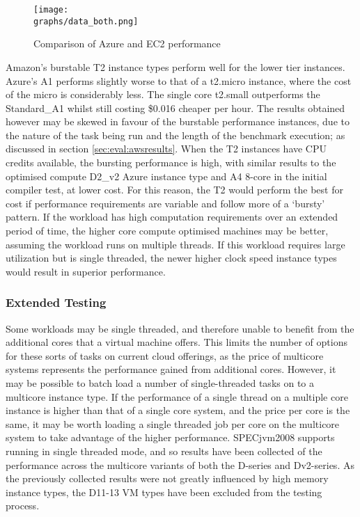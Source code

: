 \documentclass{entcs} \usepackage{entcsmacro}
\newcommand{\graphs}{../analysis/graphs}
\begin{document}
\begin{figure}[ht]
  \centering
  \texttt{[image: \\graphs/data\_both.png]}
  \caption{Comparison of Azure and EC2 performance}
  \label{fig:bothchart}
\end{figure}

Amazon's burstable T2 instance types perform well for the lower tier instances. Azure's A1 performs slightly worse to that of a t2.micro instance, where the cost of the micro is considerably less. The single core t2.small outperforms the Standard\_A1 whilst still costing \$0.016 cheaper per hour. The results obtained however may be skewed in favour of the burstable performance instances, due to the nature of the task being run and the length of the benchmark execution; as discussed in section \ref{sec:eval:awsresults}. When the T2 instances have CPU credits available, the bursting performance is high, with similar results to the optimised compute D2\_v2 Azure instance type and A4 8-core in the initial compiler test, at lower cost. For this reason, the T2 would perform the best for cost if performance requirements are variable and follow more of a `bursty' pattern. If the workload has high computation requirements over an extended period of time, the higher core compute optimised machines may be better, assuming the workload runs on multiple threads. If this workload requires large utilization but is single threaded, the newer higher clock speed instance types would result in superior performance.

\subsubsection{Extended Testing}\label{sec:eval:extended}

Some workloads may be single threaded, and therefore unable to benefit from the additional cores that a virtual machine offers. This limits the number of options for these sorts of tasks on current cloud offerings, as the price of multicore systems represents the performance gained from additional cores. However, it may be possible to batch load a number of single-threaded tasks on to a multicore instance type. If the performance of a single thread on a multiple core instance is higher than that of a single core system, and the price per core is the same, it may be worth loading a single threaded job per core on the multicore system to take advantage of the higher performance. SPECjvm2008 supports running in single threaded mode\cite{specjvmguide}, and so results have been collected of the performance across the multicore variants of both the D-series and Dv2-series. As the previously collected results were not greatly influenced by high memory instance types, the D11-13 VM types have been excluded from the testing process.
\end{document}
